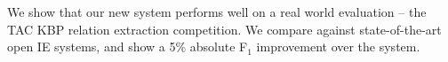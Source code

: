We show that our new system performs well on a real world evaluation --
  the TAC KBP relation extraction competition.
We compare against state-of-the-art open IE systems, and show a
  5\% absolute F$_1$ improvement over the system.


%


